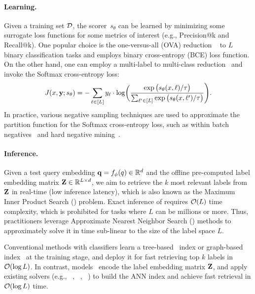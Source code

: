\vspace{-.5em}
\paragraph{Learning.}
Given a training set ${\mathcal{D}}$, the scorer~$s_\theta$ can be learned by minimizing some  surrogate loss functions for some metrics of interest (e.g., Precision@k and Recall@k).
One popular choice is the one-versus-all (OVA) reduction ~\citep{dembczynski2010bayes} to $L$ binary classification tasks and employs binary cross-entropy (BCE) loss function.
On the other hand, one can employ a multi-label to multi-class reduction~\citep{menon2019multilabel} and invoke the Softmax cross-entropy loss:
\begin{equation} 
    J(x, {\mathbf{y}}; s_\theta)
    = -\sum_{\ell \in [L]} y_\ell \cdot \log
    \biggl( \frac{ \exp\big(s_{\theta}(x,\ell)/\tau\big) }{ \sum_{\ell' \in [L]} \exp\big(s_{\theta}(x,\ell')/\tau\big) } \Biggr).
\label{eq:learning}
\end{equation}
In practice, various negative sampling techniques are used to approximate the partition function for the Softmax cross-entropy loss, such as within batch negatives~\citep{chang2020pretraining,karpukhin2020dense} and hard negative mining~\citep{xiong2021approximate,dahiya2023ngame}. 

\paragraph{Inference.}
Given a test query embedding ${\mathbf{q}} = f_\phi(q) \in {\mathbb{R}}^d$ and the offline pre-computed label embedding matrix ${\mathbf{Z}} \in {\mathbb{R}}^{L \times d}$,
we aim to retrieve the $k$ most relevant labels from ${\mathbf{Z}}$ in real-time (low inference latency), which is also known as the Maximum Inner Product Search (\MIPS) problem.
Exact inference of \MIPS requires ${\mathcal{O}}(L)$ time complexity, which is prohibited for \XMC tasks where $L$ can be millions or more.  
Thus, practitioners leverage Approximate Nearest Neighbor Search (\ANN) methods to approximately solve it in time sub-linear to the size of the label space $L$.

Conventional \XMC methods with \OVA classifiers learn a tree-based~\citep{prabhu2018parabel,zhang2021fast,yu2022pecos} \ANN index or graph-based \ANN index~\citep{liu2021label,gupta2022elias} at the training stage, and deploy it for fast retrieving top $k$ labels in ${\mathcal{O}}(\log L)$.
In contrast, \DE models~\citep{dahiya2023deep,gupta2024dual} encode the label embedding matrix ${\mathbf{Z}}$, and apply existing \ANN solvers (e.g., \FAISS~\citep{johnson2019billion}, \SCANN~\citep{guo2020accelerating}, \HNSWLIB~\citep{malkov2018efficient}) to build the ANN index and achieve fast retrieval in ${\mathcal{O}}(\log L)$ time. 
